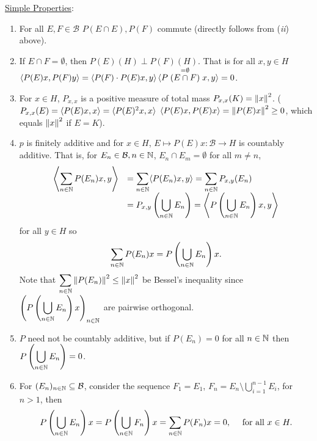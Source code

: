 \documentclass{article}
\begin{document}
\noindent\underline{Simple Properties}: 
\begin{enumerate}[label = (\roman*), align = left]
    \item For all $E,F\in \mathcal{B}$ $P(E\cap E), P(F)$ commute (directly follows from (\textit{ii}) above).
    \item If $E\cap F=\emptyset$, then $P(E)(H)\perp P(F)(H)$. That is for all $x,y\in H$ $\langle P(E)x, P(F)y\rangle=\langle P(F)\cdot P(E)x, y\rangle$$\langle P\stackrel{=\emptyset}{(E\cap F)}x, y\rangle=0$.
    \item For $x\in H$, $P_{x,x}$ is a positive measure of total mass $P_{x,x}(K) = \left\lVert x\right\rVert^2$. ($P_{x,x}(E)=\langle P(E)x, x\rangle=\langle P(E)^2x, x\rangle$ $\langle P(E)x, P(E)x\rangle=\left\lVert P(E)x\right\rVert^2\geq 0$, which equals $\left\lVert x\right\rVert^2$ if $E = K$).
    \item $p$ is finitely additive and for $x\in H$, $E\mapsto P(E)x:\mathcal{B}\to H$ is countably additive. That is, for $E_n\in \mathcal{B}, n\in \mathbb{N}$, $E_n\cap E_m = \emptyset$ for all $m\neq n$, 
    $$
    \begin{array}{ll}
        \left\langle\displaystyle\sum_{n\in\mathbb{N}}P(E_n)x,y\right\rangle
        &=\displaystyle\sum_{n\in\mathbb{N}}\langle P(E_n)x, y\rangle
        = \displaystyle\sum_{n\in\mathbb{N}}P_{x,y}(E_n)\\
        &= P_{x,y}\left(\displaystyle\bigcup_{n\in\mathbb{N}} E_n\right) = \left\langle P\left(\displaystyle\bigcup_{n\in\mathbb{N}} E_n\right)x,y\right\rangle
    \end{array}
    $$
    for all $y\in H$ so
    $$
    \displaystyle\sum_{n\in\mathbb{N}}P(E_n)x = P\left(\displaystyle\bigcup_{n\in\mathbb{N}} E_n\right)x.
    $$
    Note that $\displaystyle\sum_{n\in\mathbb{N}}\left\lVert P(E_n)\right\rVert^2\leq \left\lVert x\right\rVert^2$ be Bessel's inequality since $\left(P\left(\displaystyle\bigcup_{n\in\mathbb{N}} E_n\right)x\right)_{n\in\mathbb{N}}$ are pairwise orthogonal.
    \item $P$ need not be countably additive, but if $P(E_n) = 0$ for all $n\in\mathbb{N}$ then $P\left(\displaystyle\bigcup_{n\in\mathbb{N}} E_n\right)=0$.
    \item For $(E_n)_{n\in\mathbb{N}}\subseteq\mathcal{B}$, consider the sequence $F_1 = E_1$, $F_n = E_n\setminus \displaystyle\bigcup^{n-1}_{i=1}E_i$, for $n>1$, then 
    $$
    P\left(\displaystyle\bigcup_{n\in\mathbb{N}} E_n\right)x = P\left(\displaystyle\bigcup_{n\in\mathbb{N}} F_n\right)x = \displaystyle\sum_{n\in\mathbb{N}}P(F_n)x =0, \quad \text{ for all } x\in H.
    $$
\end{enumerate}
\end{document}
